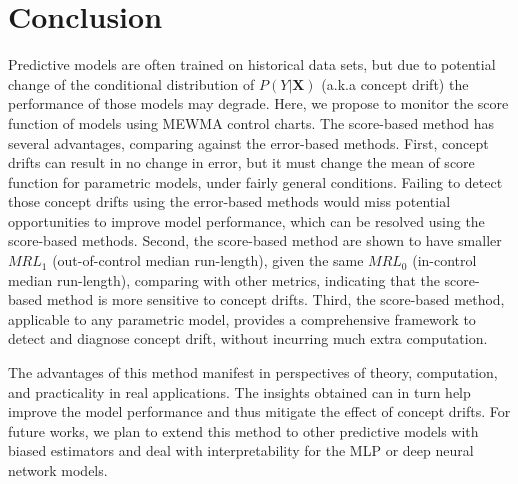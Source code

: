 \documentclass[twoside,11pt]{article}
\begin{document}
\section{Conclusion}
Predictive models are often trained on historical data sets, but due to potential change of the conditional distribution of $P (Y|\bm {X})$ (a.k.a concept drift) the performance of those models may degrade. Here, we propose to monitor the score function of models using MEWMA control charts. The score-based method has several advantages, comparing against the error-based methods. First, concept drifts can result in no change in error, but it must change the mean of score function for parametric models, under fairly general conditions. Failing to detect those concept drifts using the error-based methods would miss potential opportunities to improve model performance, which can be resolved using the score-based methods. Second, the score-based method are shown to have smaller $MRL_1$ (out-of-control median run-length), given the same $MRL_0$ (in-control median run-length), comparing with other metrics, indicating that the score-based method is more sensitive to concept drifts. Third, the score-based method, applicable to any parametric model, provides a comprehensive framework to detect and diagnose concept drift, without incurring much extra computation. 

The advantages of this method manifest in perspectives of theory, computation, and practicality in real applications. The insights obtained can in turn help improve the model performance and thus mitigate the effect of concept drifts. For future works, we plan to extend this method to other predictive models with biased estimators and deal with interpretability for the MLP or deep neural network models.

\acks{}



%

\vspace{1in}
\end{document}
